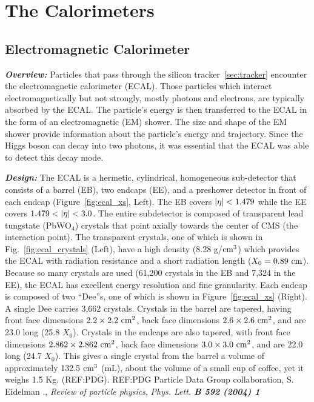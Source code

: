 \section{The Calorimeters}
\label{sec:calo}

\subsection{Electromagnetic Calorimeter}
\label{subsec:ecal}

\textit{\textbf{Overview:}}
Particles that pass through the silicon tracker~\ref{sec:tracker} encounter the electromagnetic calorimeter (ECAL).
Those particles which interact electromagnetically but not strongly, mostly photons and electrons, are typically absorbed by the ECAL.
The particle's energy is then transferred to the ECAL in the form of an electromagnetic (EM) shower.
The size and shape of the EM shower provide information about the particle's energy and trajectory.
Since the Higgs boson can decay into two photons, it was essential that the ECAL was able to detect this decay mode.

\textit{\textbf{Design:}}
The ECAL is a hermetic, cylindrical, homogeneous sub-detector that consists of a barrel (EB), two endcaps (EE), and a preshower detector in front of each endcap (Figure~\ref{fig:ecal_xs}, Left).
The EB covers $\left|\eta\right| < 1.479$ while the EE covers $1.479 < \left|\eta\right| < 3.0$.
The entire subdetector is composed of transparent lead tungstate (PbWO$_4$) crystals that point axially towards the center of CMS (the interaction point).
The transparent crystals, one of which is shown in Fig.~\ref{fig:ecal_crystals} (Left), have a high density (8.28 g/$\text{cm}^3$) which provides the ECAL with radiation resistance and a short radiation length ($X_0 = 0.89~\text{cm}$).
Because so many crystals are used (61,200 crystals in the EB and 7,324 in the EE), the ECAL has excellent energy resolution and fine granularity.
Each endcap is composed of two ``Dee''s, one of which is shown in Figure~\ref{fig:ecal_xs} (Right).
A single Dee carries 3,662 crystals.
Crystals in the barrel are tapered, having front face dimensions $2.2 \times 2.2~\text{cm}^2$, back face dimensions $2.6 \times 2.6~\text{cm}^2$, and are 23.0 \cm long (25.8 $X_0$).
Crystals in the endcaps are also tapered, with front face dimensions $2.862 \times 2.862~\text{cm}^2$, back face dimensions $3.0 \times 3.0~\text{cm}^2$, and are 22.0 \cm long (24.7 $X_0$).
This gives a single crystal from the barrel a volume of approximately 132.5 $\text{cm}^3$ (mL), about the volume of a small cup of coffee, yet it weighs 1.5 Kg.
(REF:PDG).
REF:PDG
Particle Data Group collaboration, S. Eidelman \etal., \textit{Review of particle physics},
\textit{Phys. Lett. \textbf{B 592 (2004) 1}}

